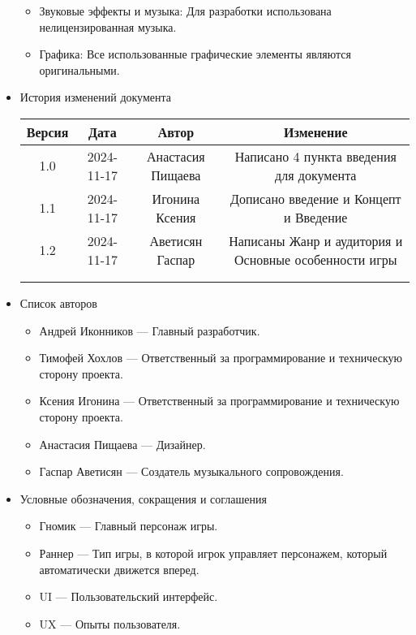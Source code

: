 \documentclass{article}
\begin{document}
\begin{itemize}
\begin{itemize}
\item Звуковые эффекты и музыка: Для разработки использована нелицензированная музыка.

\item Графика: Все использованные графические элементы являются оригинальными.
\end{itemize}

\item История изменений документа
\begin{center}
\begin{tabular}{| c | c | c | c |}
\hline
 Версия & Дата & Автор & Изменение \\  \hline
 1.0 & 2024-11-17 & Анастасия Пищаева & Написано 4 пункта введения для документа\\ \hline
 1.1 & 2024-11-17 & Игонина Ксения & Дописано введение и Концепт и Введение\\  \hline 
 1.2 & 2024-11-17 & Аветисян Гаспар & Написаны Жанр и аудитория и Основные особенности игры\\  \hline
  & & & \\  \hline
  & & & \\  \hline 
\end{tabular}
\end{center}

\item Список авторов
	\begin{itemize}
		\item Андрей Иконников — Главный разработчик.
		\item Тимофей Хохлов — Ответственный за программирование и техническую сторону проекта.
		\item Ксения Игонина — Ответственный за программирование и техническую сторону проекта.
		\item Анастасия Пищаева — Дизайнер.
		\item Гаспар Аветисян — Создатель музыкального сопровождения.
	\end{itemize}

\item Условные обозначения, сокращения и соглашения
	\begin{itemize}
            \item Гномик — Главный персонаж игры.
            \item Раннер — Тип игры, в которой игрок управляет персонажем, который автоматически движется вперед.
            \item UI — Пользовательский интерфейс.
            \item UX — Опыты пользователя.
	\end{itemize}


\end{itemize}
\end{document}
